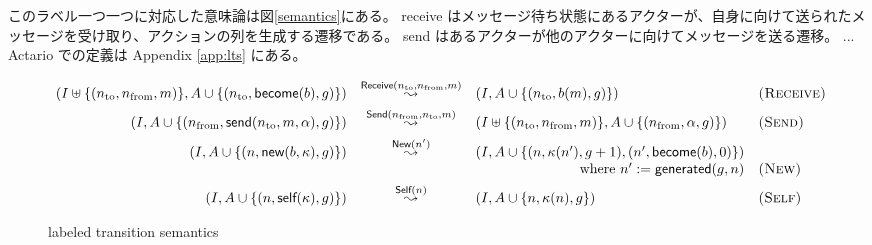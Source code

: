 このラベル一つ一つに対応した意味論は図\ref{semantics}にある。
receive はメッセージ待ち状態にあるアクターが、自身に向けて送られたメッセージを受け取り、アクションの列を生成する遷移である。
send はあるアクターが他のアクターに向けてメッセージを送る遷移。
...
Actario での定義は Appendix \ref{app:lts} にある。

\begin{figure*}[t]
  \begin{displaymath}
    \begin{array}{rcll}
      (I \uplus \{(n_{\textrm{to}}, n_{\textrm{from}}, m)\}, A \cup \{(n_{\textrm{to}}, \textsf{become}(b), g)\}) &
      \overset{\textsf{Receive}(n_{\textrm{to}}, n_{\textrm{from}}, m)}{\leadsto} &
      (I, A \cup \{(n_{\textrm{to}}, b(m), g)\}) &
      \textsc{(Receive)} \\[1ex]

      (I, A \cup \{(n_{\textrm{from}}, \textsf{send}(n_{\textrm{to}}, m, \alpha), g)\}) &
      \overset{\textsf{Send}(n_{\textrm{from}}, n_{\textrm{to}}, m)}{\leadsto} &
      (I \uplus \{(n_{\textrm{to}}, n_{\textrm{from}}, m)\}, A \cup \{(n_{\textrm{from}}, \alpha, g)\}) &
      \textsc{(Send)} \\[1ex]

      (I, A \cup \{(n, \textsf{new}(b, \kappa), g)\}) &
      \overset{\textsf{New}(n')}{\leadsto} &
      (I, A \cup \{(n, \kappa(n'), g + 1), (n', \textsf{become}(b), 0)\}) & \\
      & & \hfill \textrm{where}\ n' := \textsf{generated}(g, n) &
      \textsc{(New)} \\[1ex]

      (I, A \cup \{(n, \textsf{self}(\kappa), g)\}) &
      \overset{\textsf{Self}(n)}{\leadsto} &
      (I, A \cup \{n, \kappa(n), g\}) &
      \textsc{(Self)}
    \end{array}
  \end{displaymath}
  \caption{labeled transition semantics}\label{fig:semantics}
\end{figure*}

